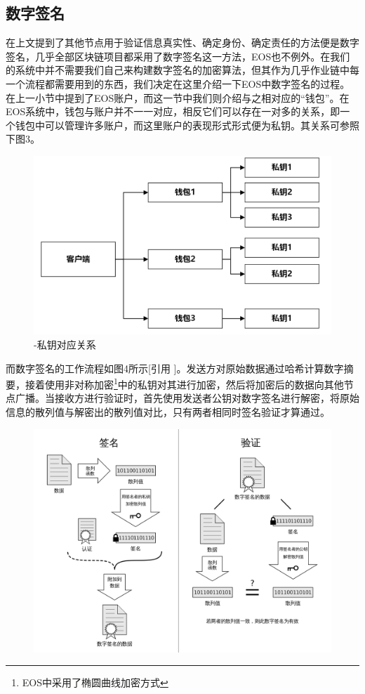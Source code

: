 \documentclass[UTF8]{ctexart}
\begin{document}
\begin{multicols}{2}
  \subsection{数字签名}
  在上文提到了其他节点用于验证信息真实性、确定身份、确定责任的方法便是数字签名，几乎全部区块链项目都采用了数字签名这一方法，EOS也不例外。在我们的系统中并不需要我们自己来构建数字签名的加密算法，但其作为几乎作业链中每一个流程都需要用到的东西，我们决定在这里介绍一下EOS中数字签名的过程。\\
  \indent 在上一小节中提到了EOS账户，而这一节中我们则介绍与之相对应的“钱包”。在EOS系统中，钱包与账户并不一一对应，相反它们可以存在一对多的关系，即一个钱包中可以管理许多账户，而这里账户的表现形式形式便为私钥。其关系可参照下图3。\\
  \begin{figure}[H]
    \centering
    \includegraphics[width=\linewidth]{image/psw.png}
    \caption{\heiti{}-私钥对应关系\songti}
  \end{figure}
  \indent 而数字签名的工作流程如图4所示[引用  ]。发送方对原始数据通过哈希计算数字摘要，接着使用非对称加密\footnote[1]{EOS中采用了椭圆曲线加密方式}中的私钥对其进行加密，然后将加密后的数据向其他节点广播。当接收方进行验证时，首先使用发送者公钥对数字签名进行解密，将原始信息的散列值与解密出的散列值对比，只有两者相同时签名验证才算通过。%
  \begin{figure}[H]
    \centering
    \includegraphics[width=\linewidth]{image/check.png}

\end{figure}
\end{multicols}
\end{document}
